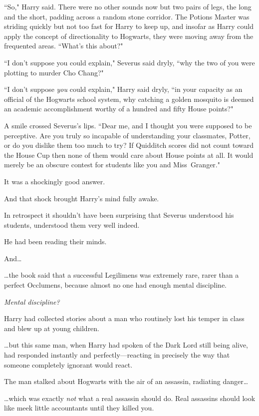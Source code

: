 \later

``So," Harry said. There were no other sounds now but two pairs of legs, the long and the short, padding across a random stone corridor. The Potions Master was striding quickly but not too fast for Harry to keep up, and insofar as Harry could apply the concept of directionality to Hogwarts, they were moving away from the frequented areas. ``What's this about?"

``I don't suppose you could explain," Severus said dryly, ``why the two of you were plotting to murder Cho Chang?"

``I don't suppose \emph{you} could explain," Harry said dryly, ``in your capacity as an official of the Hogwarts school system, why catching a golden mosquito is deemed an academic accomplishment worthy of a hundred and fifty House points?"

A smile crossed Severus's lips. ``Dear me, and I thought you were supposed to be perceptive. Are you truly so incapable of understanding your classmates, Potter, or do you dislike them too much to try? If Quidditch scores did not count toward the House Cup then none of them would care about House points at all. It would merely be an obscure contest for students like you and Miss~Granger."

It was a shockingly good answer.

And that shock brought Harry's mind fully awake.

In retrospect it shouldn't have been surprising that Severus understood his students, understood them very well indeed.

He had been reading their minds.

And{\ldots}

{\ldots}the book said that a successful Legilimens was extremely rare, rarer than a perfect Occlumens, because almost no one had enough mental discipline.

\emph{Mental discipline?}

Harry had collected stories about a man who routinely lost his temper in class and blew up at young children.

{\ldots}but this same man, when Harry had spoken of the Dark Lord still being alive, had responded instantly and perfectly---reacting in precisely the way that someone completely ignorant would react.

The man stalked about Hogwarts with the air of an assassin, radiating danger{\ldots}

{\ldots}which was exactly \emph{not} what a real assassin should do. Real assassins should look like meek little accountants until they killed you.


